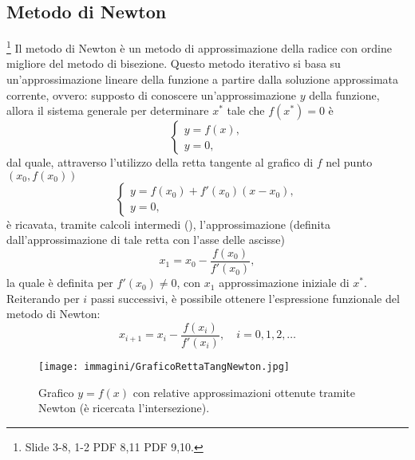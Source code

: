 \subsection{Metodo di Newton}\label{ssec:metodo_newton}
\footnote{Slide 3-8, 1-2 PDF 8,11 PDF 9,10.}
Il metodo di Newton è un metodo di approssimazione della radice con ordine migliore del metodo di bisezione. Questo metodo iterativo si basa su un'approssimazione lineare della funzione a partire dalla soluzione approssimata corrente, ovvero: supposto di conoscere un'approssimazione $y$ della funzione, allora il sistema generale per determinare $x^*$ tale che $f(x^*)=0$ è
\begin{equation*}
	\begin{cases}
		y = f(x),\\
		y = 0,
	\end{cases}
\end{equation*}
dal quale, attraverso l'utilizzo della retta tangente al grafico di $f$ nel punto $(x_0,f(x_0))$
\begin{equation}\label{eq:retta_tangente_in_0}
	\begin{cases}
		y = f(x_0) + f'(x_0)(x-x_0), \\
		y = 0,
	\end{cases}
\end{equation}
è ricavata, tramite calcoli intermedi (\footnotemark), l'approssimazione (definita dall'approssimazione di tale retta con l'asse delle ascisse)
\begin{equation*}
	x_1=x_0-\frac{f(x_0)}{f'(x_0)},
\end{equation*}
la quale è definita per $f'(x_0)\neq 0$, con $x_1$ approssimazione iniziale di $x^*$. Reiterando per $i$ passi successivi, è possibile ottenere l'espressione funzionale del metodo di Newton:
\begin{equation}\label{eq:approssimazione_newton}
	x_{i+1}=x_i-\frac{f(x_i)}{f'(x_i)}, \quad i=0,1,2,\hdots
\end{equation}


\begin{figure}
	\centering
	\texttt{[image: immagini/GraficoRettaTangNewton.jpg]}
	\label{fig:grafico_retta_tangente_metodo_newton}
	\caption{Grafico $y=f(x)$ con relative approssimazioni ottenute tramite Newton (è ricercata l'intersezione).}
\end{figure}

